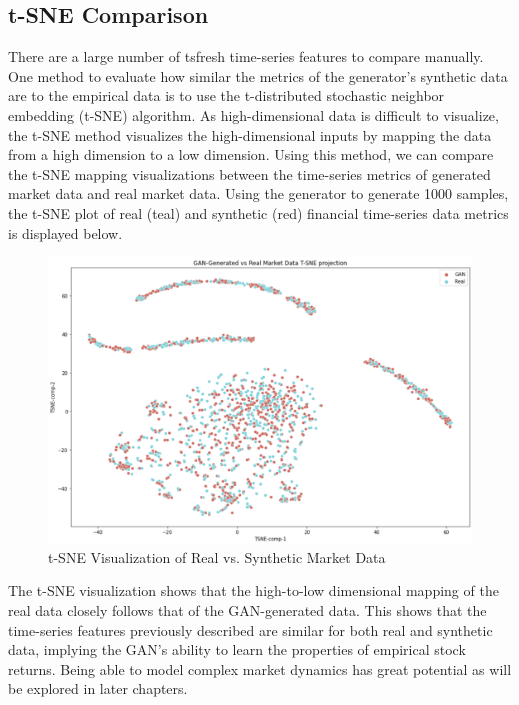 \subsection{t-SNE Comparison}
There are a large number of tsfresh time-series features to compare manually. One method to evaluate how similar the metrics of the generator's synthetic data are to the empirical data is to use the t-distributed stochastic neighbor embedding (t-SNE) \cite{tsne} algorithm. As high-dimensional data is difficult to visualize, the t-SNE method visualizes the high-dimensional inputs by mapping the data from a high dimension to a low dimension. Using this method, we can compare the t-SNE mapping visualizations between the time-series metrics of generated market data and real market data. Using the generator to generate 1000 samples, the t-SNE plot of real (teal) and synthetic (red) financial time-series data metrics is displayed below.
\begin{figure}[h]
\centering
\includegraphics[width=14cm]{templates/assets/gan/tsne.png}
\caption{t-SNE Visualization of Real vs. Synthetic Market Data}
\end{figure}

\noindent The t-SNE visualization shows that the high-to-low dimensional mapping of the real data closely follows that of the GAN-generated data. This shows that the time-series features previously described are similar for both real and synthetic data, implying the GAN's ability to learn the properties of empirical stock returns. Being able to model complex market dynamics has great potential as will be explored in later chapters.
